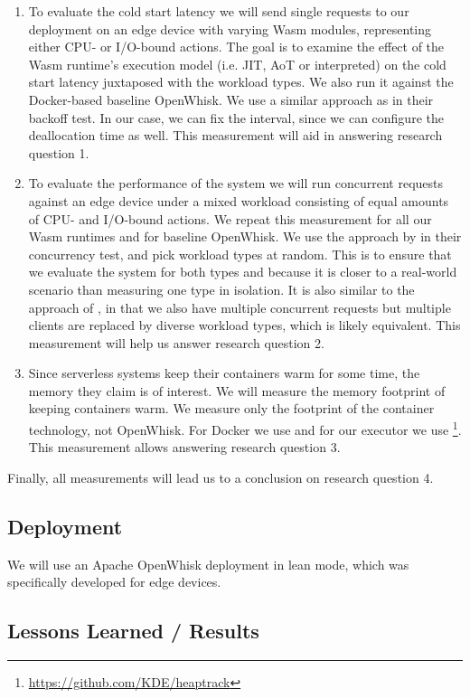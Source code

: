 \begin{enumerate}
    \item To evaluate the cold start latency we will send single requests to our deployment on an edge device with varying Wasm modules, representing either CPU- or I/O-bound actions. The goal is to examine the effect of the Wasm runtime's execution model (i.e. JIT, AoT or interpreted) on the cold start latency juxtaposed with the workload types. We also run it against the Docker-based baseline OpenWhisk. We use a similar approach as \citeauthor{McGrath2017} in their backoff test. In our case, we can fix the interval, since we can configure the deallocation time as well. This measurement will aid in answering research question 1.
    \item To evaluate the performance of the system we will run concurrent requests against an edge device under a mixed workload consisting of equal amounts of CPU- and I/O-bound actions. We repeat this measurement for all our Wasm runtimes and for baseline OpenWhisk. We use the approach by \citeauthor{McGrath2017} in their concurrency test, and pick workload types at random. This is to ensure that we evaluate the system for both types and because it is closer to a real-world scenario than measuring one type in isolation. It is also similar to the approach of \citeauthor{Hall2019}, in that we also have multiple concurrent requests but multiple clients are replaced by diverse workload types, which is likely equivalent. This measurement will help us answer research question 2.
    \item Since serverless systems keep their containers warm for some time, the memory they claim is of interest. We will measure the memory footprint of keeping containers warm.  We measure only the footprint of the container technology, not OpenWhisk. For Docker we use  and for our executor we use  \footnote{\url{https://github.com/KDE/heaptrack}}. This measurement allows answering research question 3.
\end{enumerate}

Finally, all measurements will lead us to a conclusion on research question 4.

\subsection{Deployment}

We will use an Apache OpenWhisk deployment in lean mode, which was specifically developed for edge devices.



\subsection{Lessons Learned / Results}